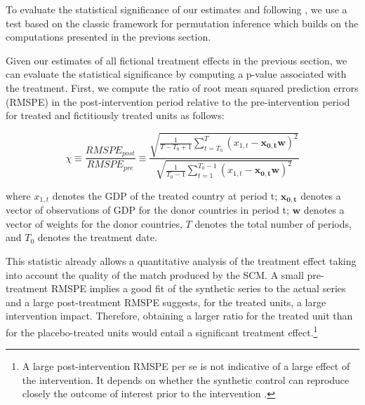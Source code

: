 \documentclass[12pt]{article}
\renewcommand{\vec}[1]{\mathbf{#1}}
\begin{document}
To evaluate the statistical significance of our estimates and following \cite{Abadie2010, Abadie2018}, we use a test based on the classic framework for permutation inference which builds on the computations presented in the previous section.

Given our estimates of all fictional treatment effects in the previous section, we can evaluate the statistical significance by computing a p-value associated with the treatment. First, we compute the ratio of root mean squared prediction errors (RMSPE) in the post-intervention period relative to the pre-intervention period for treated and fictitiously treated units as follows:

\begin{equation}
    \label{EQ_test}
    \chi \equiv \frac{RMSPE_{post}}{RMSPE_{pre}}  \equiv \frac{\sqrt{\frac{1}{T-T_0+1} \sum\limits_{t=T_0}^{T} (x_{1,t} - \vec{x_{0,t}} \vec{w})^2}}{\sqrt{\frac{1}{T_0-1} \sum\limits_{t=1}^{T_0-1} (x_{1,t} - \vec{x_{0,t}} \vec{w})^2}}
\end{equation}

where $x_{1,t}$ denotes the GDP of the treated country at period t; $\vec{x_{0,t}}$ denotes a vector of observations of GDP for the donor countries in period t; $\vec{w}$ denotes a vector of weights for the donor countries, $T$ denotes the total number of periods, and $T_0$ denotes the treatment date. 

This statistic already allows a quantitative analysis of the treatment effect taking into account the quality of the match produced by the SCM. A small pre-treatment RMSPE implies a good fit of the synthetic series to the actual series and a large post-treatment RMSPE suggests, for the treated units, a large intervention impact. Therefore, obtaining a larger ratio for the treated unit than for the placebo-treated units would entail a significant treatment effect.\footnote{A large post-intervention RMSPE per se is not indicative of a large effect of the intervention. It depends on whether the synthetic control can reproduce closely the outcome of interest prior to the intervention \cite{Abadie2019}.}
\end{document}
